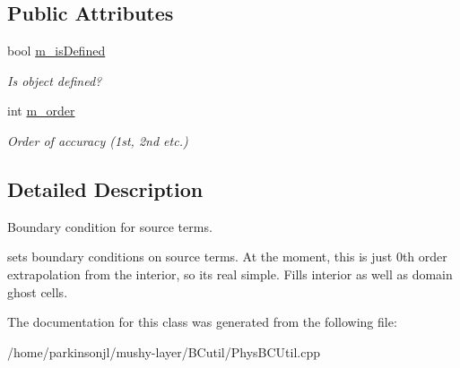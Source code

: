 \subsection*{Public Attributes}
\begin{DoxyCompactItemize}
\item 
\mbox{\label{class_extrapolation_b_c_function_a64590e6d6c7e4182ab3c5c9079620af3}} 
bool \hyperlink{class_extrapolation_b_c_function_a64590e6d6c7e4182ab3c5c9079620af3}{m\+\_\+is\+Defined}
\begin{DoxyCompactList}\small\item\em Is object defined? \end{DoxyCompactList}\item 
\mbox{\label{class_extrapolation_b_c_function_a9fda57684ad22edeee9fb5c3b98a1469}} 
int \hyperlink{class_extrapolation_b_c_function_a9fda57684ad22edeee9fb5c3b98a1469}{m\+\_\+order}
\begin{DoxyCompactList}\small\item\em Order of accuracy (1st, 2nd etc.) \end{DoxyCompactList}\end{DoxyCompactItemize}


\subsection{Detailed Description}
Boundary condition for source terms. 

sets boundary conditions on source terms. At the moment, this is just 0th order extrapolation from the interior, so it\textquotesingle{}s real simple. Fills interior as well as domain ghost cells. 

The documentation for this class was generated from the following file\+:\begin{DoxyCompactItemize}
\item 
/home/parkinsonjl/mushy-\/layer/\+B\+Cutil/Phys\+B\+C\+Util.\+cpp\end{DoxyCompactItemize}
